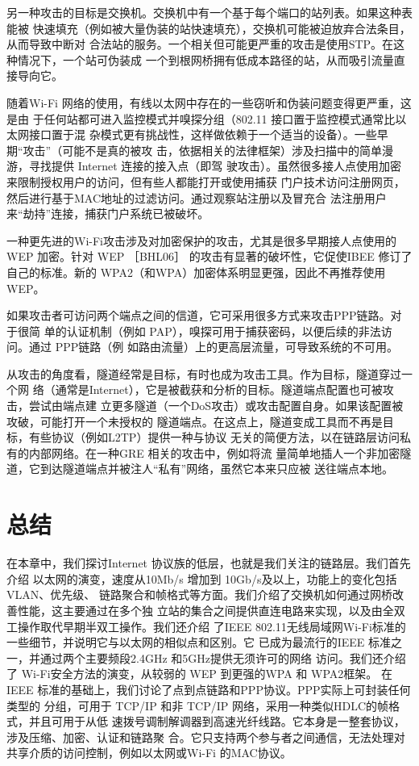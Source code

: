 另一种攻击的目标是交换机。交换机中有一个基于每个端口的站列表。如果这种表能被
快速填充（例如被大量伪装的站快速填充），交换机可能被迫放弃合法条目，从而导致中断对
合法站的服务。一个相关但可能更严重的攻击是使用STP。在这种情况下，一个站可伪装成
一个到根网桥拥有低成本路径的站，从而吸引流量直接导向它。

随着Wi-Fi 网络的使用，有线以太网中存在的一些窃听和伪装问题变得更严重，这是由
于任何站都可进入监控模式并嗅探分组（802.11 接口置于监控模式通常比以太网接口置于混
杂模式更有挑战性，这样做依赖于一个适当的设备）。一些早期“攻击”（可能不是真的被攻
击，依据相关的法律框架）涉及扫描中的简单漫游，寻找提供 Internet 连接的接入点（即驾
驶攻击）。虽然很多接人点使用加密来限制授权用户的访问，但有些人都能打开或使用捕获
门户技术访问注册网页，然后进行基于MAC地址的过滤访问。通过观察站注册以及冒充合
法注册用户来“劫持”连接，捕获门户系统已被破坏。

一种更先进的Wi-Fi攻击涉及对加密保护的攻击，尤其是很多早期接人点使用的 WEP
加密。针对 WEP ［BHL06］ 的攻击有显著的破坏性，它促使IBEE 修订了自己的标准。新的
WPA2（和WPA）加密体系明显更强，因此不再推荐使用WEP。

如果攻击者可访问两个端点之间的信道，它可采用很多方式来攻击PPP链路。对于很简
单的认证机制（例如 PAP），嗅探可用于捕获密码，以便后续的非法访问。通过 PPP链路（例
如路由流量）上的更高层流量，可导致系统的不可用。

从攻击的角度看，隧道经常是目标，有时也成为攻击工具。作为目标，隧道穿过一个网
络（通常是Internet），它是被截获和分析的目标。隧道端点配置也可被攻击，尝试由端点建
立更多隧道（一个DoS攻击）或攻击配置自身。如果该配置被攻破，可能打开一个未授权的
隧道端点。在这点上，隧道变成工具而不再是目标，有些协议（例如L2TP）提供一种与协议
无关的简便方法，以在链路层访问私有的内部网络。在一种GRE 相关的攻击中，例如将流
量简单地插人一个非加密隧道，它到达隧道端点并被注人“私有”网络，虽然它本来只应被
送往端点本地。

\section{总结}

在本章中，我们探讨Internet 协议族的低层，也就是我们关注的链路层。我们首先介绍
以太网的演变，速度从10Mb/s 增加到 10Gb/s及以上，功能上的变化包括VLAN、优先级、
链路聚合和帧格式等方面。我们介绍了交换机如何通过网桥改善性能，这主要通过在多个独
立站的集合之间提供直连电路来实现，以及由全双工操作取代早期半双工操作。我们还介绍
了IEEE 802.11无线局域网Wi-Fi标准的一些细节，并说明它与以太网的相似点和区别。它
已成为最流行的IEEE 标准之一，并通过两个主要频段2.4GHz 和5GHz提供无须许可的网络
访问。我们还介绍了 Wi-Fi安全方法的演变，从较弱的 WEP 到更强的WPA 和 WPA2框架。
在IEEE 标准的基础上，我们讨论了点到点链路和PPP协议。PPP实际上可封装任何类型的
分组，可用于 TCP/IP 和非 TCP/IP 网络，采用一种类似HDLC的帧格式，并且可用于从低
速拨号调制解调器到高速光纤线路。它本身是一整套协议，涉及压缩、加密、认证和链路聚
合。它只支持两个参与者之间通信，无法处理对共享介质的访问控制，例如以太网或Wi-Fi
的MAC协议。


